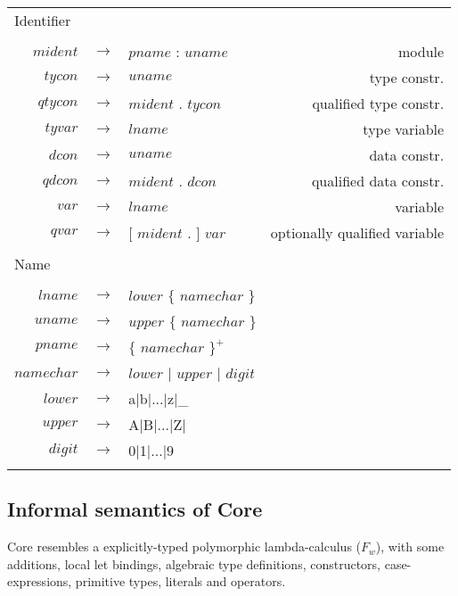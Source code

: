 \begin{footnotesize}
\begin{longtable}{ r c l r }
\multicolumn{4}{l}{Identifier}			 \\
\\[0.01in]
$mident$	& $ \rightarrow $	& $pname$ : $uname$									& module		\\
$tycon$		& $ \rightarrow $	& $uname$										& type constr.		\\
$qtycon$	& $ \rightarrow $	& $mident$ . $tycon$									& qualified type constr.\\
$tyvar$		& $ \rightarrow $	& $lname$										& type variable		\\
$dcon$		& $ \rightarrow $	& $uname$										& data constr.		\\
$qdcon$		& $ \rightarrow $	& $mident$ . $dcon$									& qualified data constr.\\
$var$		& $ \rightarrow $	& $lname$										& variable		\\
$qvar$		& $ \rightarrow $	& $[$ $mident$ . $]$ $var$								& optionally qualified variable\\
\\[0.01in]

\multicolumn{4}{l}{Name}			 \\
\\[0.01in]
$lname$		& $ \rightarrow $	& $lower$ $\{$ $namechar$ $\}$								& \\
$uname$		& $ \rightarrow $	& $upper$ $\{$ $namechar$ $\}$								& \\
$pname$		& $ \rightarrow $	& $\{$ $namechar$ $\}^{+}$								& \\
$namechar$	& $ \rightarrow $	& $lower$ $|$ $upper$ $|$ $digit$							& \\
$lower$		& $ \rightarrow $	& a$|$b$|$...$|$z$|$\_									& \\
$upper$		& $ \rightarrow $	& A$|$B$|$...$|$Z$|$									& \\
$digit$		& $ \rightarrow $	& 0$|$1$|$...$|$9									& \\
\\[0.01in]

\end{longtable}
\end{footnotesize}



\subsection{Informal semantics of Core}

Core resembles a explicitly-typed polymorphic lambda-calculus ($F_{w}$), with some additions,
local let bindings, algebraic type definitions, constructors, case-expressions, primitive types,
literals and operators.\cite{tolmach2010ghc}

